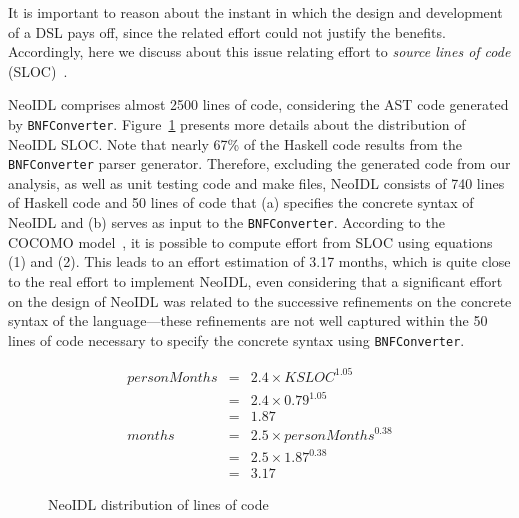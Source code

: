 \documentclass{ws-ijseke}
\newcommand{\neoidl}{NeoIDL}
\newcommand{\bnfc}{\texttt{BNFConverter}}
\begin{document}
It is important to reason about the instant in which the design and 
development of a DSL pays off, since the related effort could not justify 
the benefits. Accordingly, here we discuss about this issue relating 
effort to \emph{source lines of code} (SLOC)~\cite{park-sloc:1992}.

\neoidl{} comprises almost 2500 lines of code,
considering the AST code generated
by \bnfc. 
Figure~\ref{graph:sloc} presents more details about the distribution
of \neoidl{} SLOC. 
Note that nearly 67\% of the Haskell code results from the
\bnfc{} parser generator. Therefore, excluding the generated code from
our analysis, as well as unit testing code and make files, \neoidl{} consists
of 740 lines of Haskell code and 50 lines of code that (a) specifies the
concrete syntax of \neoidl{} and (b) serves as input to the
\bnfc. According to the COCOMO model~\cite{bohem:2000}, it is possible to 
compute effort from SLOC using equations (1) and (2). This leads to an
effort estimation of 3.17 months, which is quite close to the real
effort to implement \neoidl{}, even considering that a significant effort on the
design of \neoidl{}  was related to the successive refinements on the concrete syntax
of the language---these refinements are not well captured within the 50
lines of code necessary to specify the concrete syntax using \bnfc.

\begin{small}
\begin{eqnarray}
personMonths & = & 2.4 \times KSLOC ^ {1.05} \\  
        & = & 2.4 \times 0.79 ^ {1.05}  \nonumber \\ 
        & = & 1.87 \nonumber \\
months & = & 2.5 \times personMonths^{0.38} \\
    & = & 2.5 \times 1.87^{0.38} \nonumber \\
    & = & 3.17 \nonumber
\end{eqnarray} 
\end{small}


\begin{figure}[bth]
\begin{center}
\vspace{-1cm}
\vspace{-.5cm}
\end{center}
\caption{\neoidl{} distribution of lines of code}
\label{graph:sloc}
\end{figure}
\end{document}

